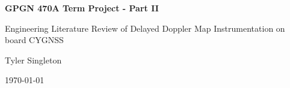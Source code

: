 \begin{center}
    \large
    \textbf{GPGN 470A Term Project - Part II}
    
    \vspace{0.4cm}
    \large
    Engineering Literature Review of Delayed Doppler Map Instrumentation on board CYGNSS
    
    \vspace{0.4cm}
    Tyler Singleton
    
    \vspace{0.4cm}
    \today
    
    \vspace{0.9cm}
\end{center}